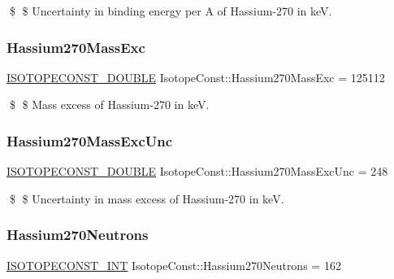 \$ \$ Uncertainty in binding energy per A of Hassium-\/270 in keV. \mbox{\label{group___isotope_const-_hassium-_hs270_ga6fc826d84d78c19aa57cab4d7ab3a510}} 
\subsubsection{\texorpdfstring{Hassium270\+Mass\+Exc}{Hassium270MassExc}}
{\footnotesize\ttfamily \mbox{\hyperlink{group___isotope_const-_macros_ga8f45a7272ce02c0b4c65c44636ed719a}{I\+S\+O\+T\+O\+P\+E\+C\+O\+N\+S\+T\+\_\+\+D\+O\+U\+B\+LE}} Isotope\+Const\+::\+Hassium270\+Mass\+Exc = 125112}

\$ \$ Mass excess of Hassium-\/270 in keV. \mbox{\label{group___isotope_const-_hassium-_hs270_gaabd6dd4aaa0272db3251f9b403873255}} 
\subsubsection{\texorpdfstring{Hassium270\+Mass\+Exc\+Unc}{Hassium270MassExcUnc}}
{\footnotesize\ttfamily \mbox{\hyperlink{group___isotope_const-_macros_ga8f45a7272ce02c0b4c65c44636ed719a}{I\+S\+O\+T\+O\+P\+E\+C\+O\+N\+S\+T\+\_\+\+D\+O\+U\+B\+LE}} Isotope\+Const\+::\+Hassium270\+Mass\+Exc\+Unc = 248}

\$ \$ Uncertainty in mass excess of Hassium-\/270 in keV. \mbox{\label{group___isotope_const-_hassium-_hs270_gaa378e5126aa4d5bd716717cbb2c2fb76}} 
\subsubsection{\texorpdfstring{Hassium270\+Neutrons}{Hassium270Neutrons}}
{\footnotesize\ttfamily \mbox{\hyperlink{group___isotope_const-_macros_ga5f18360b3e99483a35c32d789e62621c}{I\+S\+O\+T\+O\+P\+E\+C\+O\+N\+S\+T\+\_\+\+I\+NT}} Isotope\+Const\+::\+Hassium270\+Neutrons = 162}

